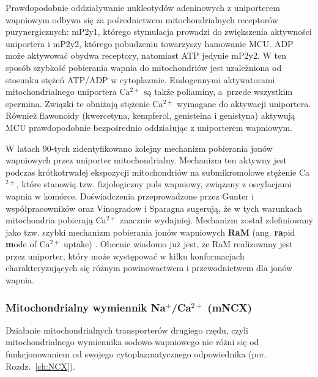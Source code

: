 Prawdopodobnie oddziaływanie nukleotydów adeninowych z uniporterem wapniowym odbywa się za pośrednictwem mitochondrialnych receptorów purynergicznych: mP2y1, którego stymulacja prowadzi do zwiększenia aktywności uniportera i mP2y2, którego pobudzeniu towarzyszy hamowanie MCU. ADP może aktywować obydwa receptory, natomiast ATP jedynie mP2y2. W ten sposób szybkość pobierania wapnia do mitochondriów jest uzależniona od stosunku stężeń ATP/ADP w cytoplazmie. Endogennymi aktywatorami mitochondrialnego uniportera Ca$^{2+}$ są także poliaminy, a~przede wszystkim spermina. Związki te obniżają stężenie Ca$^{2+}$ wymagane do aktywacji uniportera. Również flawonoidy (kwercetyna, kempferol, genisteina i genistyna) aktywują MCU prawdopodobnie bezpośrednio oddziałując z uniporterem wapniowym.

W latach 90-tych zidentyfikowano kolejny mechanizm pobierania jonów wapniowych przez uniporter mitochondrialny. Mechanizm ten aktywny jest podczas krótkotrwałej ekspozycji mitochondriów na submikromolowe stężenie Ca$^{2+}$, które stanowią tzw. fizjologiczny puls wapniowy, związany z oscylacjami wapnia w komórce. Doświadczenia przeprowadzone przez Gunter i współpracowników oraz Vinogradow i Sparagna sugerują, że w tych warunkach mitochondria pobierają Ca$^{2+}$ znacznie wydajniej. Mechanizm został zdefiniowany jako tzw. szybki mechanizm pobierania jonów wapniowych \textbf{RaM} (ang. \textbf{ra}pid \textbf{m}ode of Ca$^{2+}$ uptake) \cite{Buntinas2001,Gunter1990,Sparagna1995,Vinogradov1973}. Obecnie wiadomo już jest, że RaM realizowany jest przez uniporter, który może występować w kilku konformacjach charakteryzujących się różnym powinowactwem i przewodnictwem dla jonów wapnia.

\subsubsection{Mitochondrialny wymiennik Na$^+$/Ca$^{2+}$ (mNCX)}
\label{ch:mNCX}

Działanie mitochondrialnych transporterów drugiego rzędu, czyli mitochondrialnego wymiennika sodowo-wapniowego nie różni się od funkcjonowaniem od swojego cytoplazmatycznego odpowiednika (por. Rozdz.~\ref{ch:NCX}).

\bigskip

